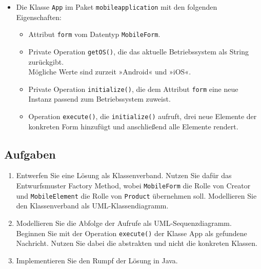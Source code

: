 \documentclass[main.tex]{subfiles}
\begin{document}
\begin{itemize}
    \item Die Klasse \lstinline|App| im Paket \lstinline|mobileapplication| mit den folgenden Eigenschaften:
    \begin{itemize}
        \item Attribut \lstinline|form| vom Datentyp \lstinline|MobileForm|.
        \item Private Operation \lstinline|getOS()|, die das aktuelle Betriebssystem als String zurückgibt. \\
        Mögliche Werte sind zurzeit »Android« und »iOS«.
        \item Private Operation \lstinline|initialize()|, die dem Attribut \lstinline|form| eine neue Instanz passend zum Betriebssystem zuweist.
        \item Operation \lstinline|execute()|, die \lstinline|initialize()| aufruft, drei neue Elemente der konkreten Form hinzufügt und anschließend alle Elemente rendert.
    \end{itemize}
\end{itemize}

\subsection{Aufgaben}
\begin{enumerate}
    \item Entwerfen Sie eine Lösung als Klassenverband. Nutzen Sie dafür das Entwurfsmuster Factory Method, wobei \lstinline|MobileForm| die Rolle von Creator und \lstinline|MobileElement| die Rolle von \lstinline|Product| übernehmen soll. Modellieren Sie den Klassenverband als UML-Klassendiagramm.
    \item Modellieren Sie die Abfolge der Aufrufe als UML-Sequenzdiagramm. Beginnen Sie mit der Operation \lstinline|execute()| der Klasse App als gefundene Nachricht. Nutzen Sie dabei die abstrakten und nicht die konkreten Klassen.
    \item Implementieren Sie den Rumpf der Lösung in Java.
\end{enumerate}
\end{document}
